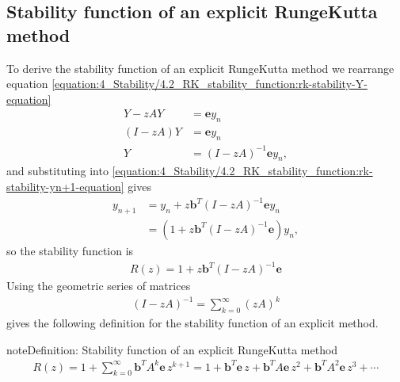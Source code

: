 \documentclass[letterpaper,10pt,english]{jupyterBook}
\begin{document}
\subsection{Stability function of an explicit Runge\sphinxhyphen{}Kutta method}
\label{\detokenize{4_Stability/4.2_RK_stability_function:stability-function-of-an-explicit-runge-kutta-method}}\label{\detokenize{4_Stability/4.2_RK_stability_function:erk-rz-section}}
\sphinxAtStartPar
To derive the stability function of an explicit Runge\sphinxhyphen{}Kutta method we rearrange equation \eqref{equation:4_Stability/4.2_RK_stability_function:rk-stability-Y-equation}
\begin{align*}
    Y - zAY &= \mathbf{e}y_n \\
    (I - zA)Y &= \mathbf{e}y_n\\
    Y&= (I-zA)^{-1} \mathbf{e}y_n,
\end{align*}
\sphinxAtStartPar
and substituting into \eqref{equation:4_Stability/4.2_RK_stability_function:rk-stability-yn+1-equation} gives
\begin{align*}
    y_{n+1} &= y_n +z\mathbf{b}^T (I-zA)^{-1} \mathbf{e} y_n \\
    &= (1 + z \mathbf{b}^T (I - zA)^{-1} \mathbf{e})y_n ,
\end{align*}
\sphinxAtStartPar
so the stability function is
\begin{align*}
    R(z)=1 + z\mathbf{b}^T (I - zA)^{-1} \mathbf{e}
\end{align*}
\sphinxAtStartPar
Using the geometric series of matrices
\begin{align*}
    (I - zA)^{-1} = \sum_{k=0}^{\infty} (zA)^k 
\end{align*}
\sphinxAtStartPar
gives the following definition for the stability function of an explicit method.

\begin{sphinxadmonition}{note}{Definition: Stability function of an explicit Runge\sphinxhyphen{}Kutta method}
\begin{equation}\label{equation:4_Stability/4.2_RK_stability_function:erk-stability-rz-equation}
\begin{split}R(z)=1+\sum_{k=0}^{\infty} \mathbf{b}^T A^k \mathbf{e}\,z^{k+1} =1+\mathbf{b}^T \mathbf{e}\,z+\mathbf{b}^T A\mathbf{e}\,z^2 +\mathbf{b}^T A^2 \mathbf{e}\,z^3 + \cdots\end{split}
\end{equation}\end{sphinxadmonition}
\end{document}
